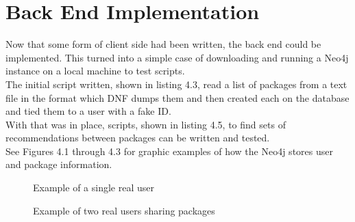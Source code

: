 \documentclass{l4proj}
\begin{document}
\section{Back End Implementation}
Now that some form of client side had been written, the back end could be implemented. This turned into a simple case of downloading and running a Neo4j instance on a local machine to test scripts.\\
The initial script written, shown in listing 4.3, read a list of packages from a text file in the format which DNF dumps them and then created each on the database and tied them to a user with a fake ID.\\
With that was in place, scripts, shown in listing 4.5, to find sets of recommendations between packages can be written and tested.\\
See Figures 4.1 through 4.3 for graphic examples of how the Neo4j stores user and package information.\\
\begin{figure}
\caption{Example of a single real user}
\end{figure}
\begin{figure}
\caption{Example of two real users sharing packages}
\end{figure}
\end{document}
